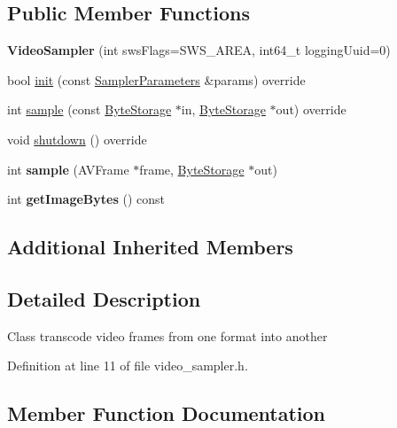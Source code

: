\subsection*{Public Member Functions}
\begin{DoxyCompactItemize}
\item 
\mbox{\label{classffmpeg_1_1VideoSampler_a697edb27227597b55a088d2864996b9f}} 
{\bfseries Video\+Sampler} (int sws\+Flags=S\+W\+S\+\_\+\+A\+R\+EA, int64\+\_\+t logging\+Uuid=0)
\item 
bool \hyperlink{classffmpeg_1_1VideoSampler_a8004cb1c8f7608f24dc84144e0de0c3e}{init} (const \hyperlink{structffmpeg_1_1SamplerParameters}{Sampler\+Parameters} \&params) override
\item 
int \hyperlink{classffmpeg_1_1VideoSampler_aaafa56981b07358bd41603c06fc5e92c}{sample} (const \hyperlink{classffmpeg_1_1ByteStorage}{Byte\+Storage} $\ast$in, \hyperlink{classffmpeg_1_1ByteStorage}{Byte\+Storage} $\ast$out) override
\item 
void \hyperlink{classffmpeg_1_1VideoSampler_adebf591691d44b6f37bdcc74e3719554}{shutdown} () override
\item 
\mbox{\label{classffmpeg_1_1VideoSampler_a4a339e90893579a6b0eb6f7a910683f8}} 
int {\bfseries sample} (A\+V\+Frame $\ast$frame, \hyperlink{classffmpeg_1_1ByteStorage}{Byte\+Storage} $\ast$out)
\item 
\mbox{\label{classffmpeg_1_1VideoSampler_a667aa8daec3fff8c294b32fdafdec00a}} 
int {\bfseries get\+Image\+Bytes} () const
\end{DoxyCompactItemize}
\subsection*{Additional Inherited Members}


\subsection{Detailed Description}
Class transcode video frames from one format into another 

Definition at line 11 of file video\+\_\+sampler.\+h.



\subsection{Member Function Documentation}
\mbox{\label{classffmpeg_1_1VideoSampler_a8004cb1c8f7608f24dc84144e0de0c3e}} 
